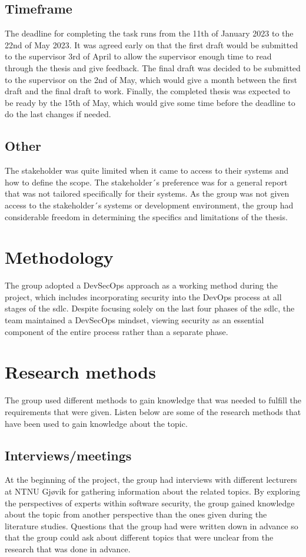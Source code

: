 \subsection{Timeframe}
The deadline for completing the task runs from the 11th of January 2023 to the 22nd of May 2023. It was agreed early on that the first draft would be submitted to the supervisor 3rd of April to allow the supervisor enough time to read through the thesis and give feedback. The final draft was decided to be submitted to the supervisor on the 2nd of May, which would give a month between the first draft and the final draft to work. Finally, the completed thesis was expected to be ready by the 15th of May, which would give some time before the deadline to do the last changes if needed. 



\subsection{Other}
The stakeholder was quite limited when it came to access to their systems and how to define the scope. The stakeholder´s preference was for a general report that was not tailored specifically for their systems. As the group was not given access to the stakeholder´s systems or development environment, the group had considerable freedom in determining the specifics and limitations of the thesis. 

\section{Methodology}
The group adopted a DevSecOps approach as a working method during the project, which includes incorporating security into the DevOps process at all stages of the \acrshort{sdlc}. Despite focusing solely on the last four phases of the \acrshort{sdlc}, the team maintained a DevSecOps mindset, viewing security as an essential component of the entire process rather than a separate phase. 

\newpage
\section{Research methods}
The group used different methods to gain knowledge that was needed to fulfill the requirements that were given. 
Listen below are some of the research methods that have been used to gain knowledge about the topic. 
\subsection{Interviews/meetings}
At the beginning of the project, the group had interviews with different lecturers at NTNU Gjøvik for gathering information about the related topics. By exploring the perspectives of experts within software security, the group gained knowledge about the topic from another perspective than the ones given during the literature studies. Questions that the group had were written down in advance so that the group could ask about different topics that were unclear from the research that was done in advance.   

